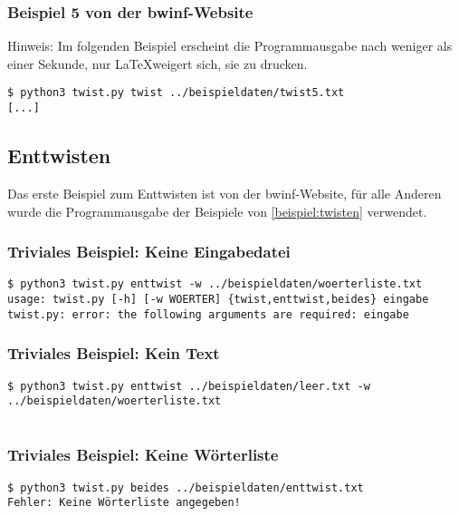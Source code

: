 \documentclass[a4paper,10pt,ngerman]{scrartcl}
\begin{document}
\subsubsection{Beispiel 5 von der bwinf-Website}
\label{beispiel:twisten:5}
Hinweis: Im folgenden Beispiel erscheint die Programmausgabe nach weniger als einer Sekunde, nur \LaTeX weigert sich, sie zu drucken.
\begin{lstlisting}[breaklines=true]
$ python3 twist.py twist ../beispieldaten/twist5.txt
[...]
\end{lstlisting}



\subsection{Enttwisten}
Das erste Beispiel zum Enttwisten ist von der bwinf-Website, für alle Anderen wurde die Programmausgabe der Beispiele von \ref{beispiel:twisten} verwendet.


\subsubsection{Triviales Beispiel: Keine Eingabedatei}
\begin{lstlisting}[breaklines=true]
$ python3 twist.py enttwist -w ../beispieldaten/woerterliste.txt
usage: twist.py [-h] [-w WOERTER] {twist,enttwist,beides} eingabe
twist.py: error: the following arguments are required: eingabe
\end{lstlisting}


\subsubsection{Triviales Beispiel: Kein Text}
\begin{lstlisting}[breaklines=true]
  $ python3 twist.py enttwist ../beispieldaten/leer.txt -w ../beispieldaten/woerterliste.txt


\end{lstlisting}


\subsubsection{Triviales Beispiel: Keine Wörterliste}
\begin{lstlisting}[breaklines=true]
$ python3 twist.py beides ../beispieldaten/enttwist.txt
Fehler: Keine Wörterliste angegeben!
\end{lstlisting}
\end{document}
